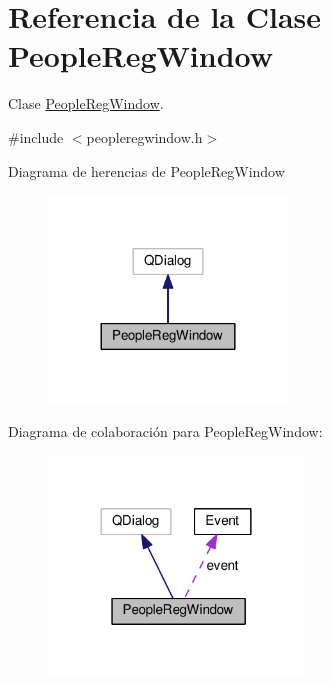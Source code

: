\hypertarget{class_people_reg_window}{}\section{Referencia de la Clase People\+Reg\+Window}
\label{class_people_reg_window}


Clase \hyperlink{class_people_reg_window}{People\+Reg\+Window}.  




{\ttfamily \#include $<$peopleregwindow.\+h$>$}



Diagrama de herencias de People\+Reg\+Window\nopagebreak
\begin{figure}[H]
\begin{center}
\leavevmode
\includegraphics[width=180pt]{class_people_reg_window__inherit__graph}
\end{center}
\end{figure}


Diagrama de colaboración para People\+Reg\+Window\+:\nopagebreak
\begin{figure}[H]
\begin{center}
\leavevmode
\includegraphics[width=192pt]{class_people_reg_window__coll__graph}
\end{center}
\end{figure}
